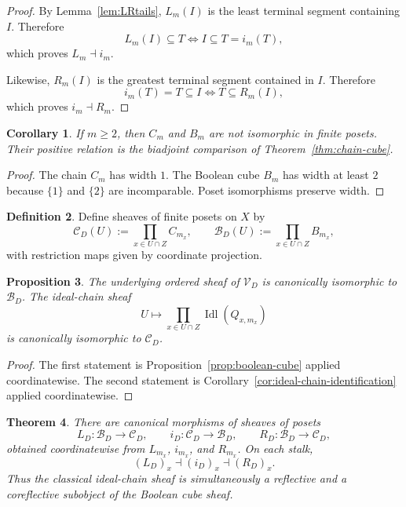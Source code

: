 \documentclass[11pt,a4paper]{article}
\newtheorem{theorem}{Theorem}[section]
\newtheorem{proposition}[theorem]{Proposition}
\newtheorem{corollary}[theorem]{Corollary}
\theoremstyle{definition}
\newtheorem{definition}[theorem]{Definition}
\theoremstyle{remark}
\DeclareMathOperator{\Idl}{Idl}
\newcommand{\Vd}{\mathcal V_D}
\newcommand{\Cd}{\mathcal C_D}
\newcommand{\Bd}{\mathcal B_D}
\begin{document}
\begin{proof}
By Lemma~\ref{lem:LRtails}, $L_m(I)$ is the least terminal segment containing $I$. Therefore
\[
L_m(I)\subseteq T\iff I\subseteq T=i_m(T),
\]
which proves $L_m\dashv i_m$.

Likewise, $R_m(I)$ is the greatest terminal segment contained in $I$. Therefore
\[
i_m(T)=T\subseteq I\iff T\subseteq R_m(I),
\]
which proves $i_m\dashv R_m$.
\end{proof}

\begin{corollary}\label{cor:not-iso-chain-cube}
If $m\geq2$, then $C_m$ and $B_m$ are not isomorphic in finite posets. Their positive relation is the biadjoint comparison of Theorem~\ref{thm:chain-cube}.
\end{corollary}

\begin{proof}
The chain $C_m$ has width $1$. The Boolean cube $B_m$ has width at least $2$ because $\{1\}$ and $\{2\}$ are incomparable. Poset isomorphisms preserve width.
\end{proof}

\begin{definition}
Define sheaves of finite posets on $X$ by
\[
\Cd(U):=\prod_{x\in U\cap Z} C_{m_x},
\qquad
\Bd(U):=\prod_{x\in U\cap Z} B_{m_x},
\]
with restriction maps given by coordinate projection.
\end{definition}

\begin{proposition}\label{prop:sheaves-posets}
The underlying ordered sheaf of $\Vd$ is canonically isomorphic to $\Bd$. The ideal-chain sheaf
\[
U\longmapsto \prod_{x\in U\cap Z}\Idl(Q_{x,m_x})
\]
is canonically isomorphic to $\Cd$.
\end{proposition}

\begin{proof}
The first statement is Proposition~\ref{prop:boolean-cube} applied coordinatewise. The second statement is Corollary~\ref{cor:ideal-chain-identification} applied coordinatewise.
\end{proof}

\begin{theorem}\label{thm:sheafified-chain-cube}
There are canonical morphisms of sheaves of posets
\[
L_D:\Bd\to \Cd,
\qquad
i_D:\Cd\to \Bd,
\qquad
R_D:\Bd\to \Cd,
\]
obtained coordinatewise from $L_{m_x}$, $i_{m_x}$, and $R_{m_x}$. On each stalk,
\[
(L_D)_x\dashv (i_D)_x\dashv (R_D)_x.
\]
Thus the classical ideal-chain sheaf is simultaneously a reflective and a coreflective subobject of the Boolean cube sheaf.
\end{theorem}
\end{document}
